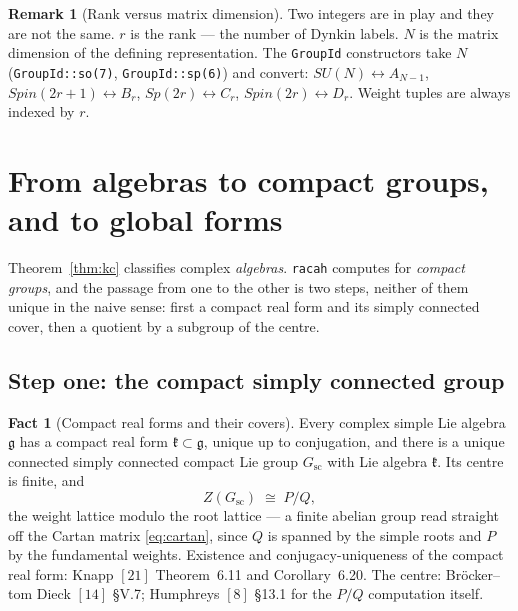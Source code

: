 \documentclass[11pt,a4paper]{article}
\theoremstyle{plain}
\theoremstyle{definition}
\newtheorem{fact}[theorem]{Fact}
\newtheorem{remark}[theorem]{Remark}
\newcommand{\g}{\mathfrak{g}}
\newcommand{\code}[1]{\texttt{#1}}
\begin{document}
\begin{remark}[Rank versus matrix dimension]
Two integers are in play and they are not the same. $r$ is the rank --- the
number of Dynkin labels. $N$ is the matrix dimension of the defining
representation. The \code{GroupId} constructors take $N$
(\code{GroupId::so(7)}, \code{GroupId::sp(6)}) and convert:
$SU(N)\leftrightarrow A_{N-1}$, $Spin(2r+1)\leftrightarrow B_r$,
$Sp(2r)\leftrightarrow C_r$, $Spin(2r)\leftrightarrow D_r$. Weight tuples are
always indexed by $r$.
\end{remark}

\section{From algebras to compact groups, and to global forms}
\label{sec:global}

Theorem~\ref{thm:kc} classifies complex \emph{algebras}. \code{racah} computes
for \emph{compact groups}, and the passage from one to the other is two steps,
neither of them unique in the naive sense: first a compact real form and its
simply connected cover, then a quotient by a subgroup of the centre.

\subsection{Step one: the compact simply connected group}
\label{sec:compactforms}

\begin{fact}[Compact real forms and their covers]\label{fact:compactform}
Every complex simple Lie algebra $\g$ has a compact real form
$\mathfrak{k}\subset\g$, unique up to conjugation, and there is a unique
connected simply connected compact Lie group $G_{\mathrm{sc}}$ with Lie algebra
$\mathfrak{k}$. Its centre is finite, and
\begin{equation}\label{eq:centre}
  Z(G_{\mathrm{sc}}) \;\cong\; P/Q ,
\end{equation}
the weight lattice modulo the root lattice --- a finite abelian group read
straight off the Cartan matrix \eqref{eq:cartan}, since $Q$ is spanned by the
simple roots and $P$ by the fundamental weights. Existence and
conjugacy-uniqueness of the compact real form: Knapp $[21]$ Theorem~6.11 and
Corollary~6.20. The centre: Br\"ocker--tom Dieck $[14]$ \S V.7;
Humphreys $[8]$ \S13.1 for the $P/Q$ computation itself.
\end{fact}
\end{document}
